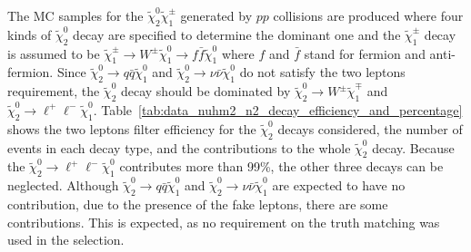 The MC samples for the $\widetilde{\chi}^{0}_{2} \widetilde{\chi}^{\pm}_{1}$ generated by $pp$ collisions are produced where four kinds of $\widetilde{\chi}^{0}_{2}$ decay are specified to determine the dominant one and the $\widetilde{\chi}^{\pm}_{1}$ decay is assumed to be $\widetilde{\chi}^{\pm}_{1} \to W^{\pm} \widetilde{\chi}^{0}_{1} \to f\bar{f} \widetilde{\chi}^{0}_{1}$ where $f$ and $\bar{f}$ stand for fermion and anti-fermion.
Since $\widetilde{\chi}^{0}_{2} \to q\bar{q} \widetilde{\chi}^{0}_{1}$ and $\widetilde{\chi}^{0}_{2} \to \nu\bar{\nu} \widetilde{\chi}^{0}_{1}$ do not satisfy the two leptons requirement, the $\widetilde{\chi}^{0}_{2}$ decay should be dominated by $\widetilde{\chi}^{0}_{2} \to W^{\pm} \widetilde{\chi}^{\mp}_{1}$ and $\widetilde{\chi}^{0}_{2} \to \ell^{+}\ell^{-} \widetilde{\chi}^{0}_{1}$.
Table~\ref{tab:data_nuhm2_n2_decay_efficiency_and_percentage} shows the two leptons filter efficiency for the $\widetilde{\chi}^{0}_{2}$ decays considered, the number of events in each decay type, and the contributions to the whole $\widetilde{\chi}^{0}_{2}$ decay.
Because the $\tilde{\chi}^{0}_{2} \to \ell^{+} \ell^{-} \tilde{\chi}^{0}_{1}$ contributes more than 99\%, the other three decays can be neglected.
Although $\tilde{\chi}^{0}_{2} \to q \bar{q} \tilde{\chi}^{0}_{1}$ and $\tilde{\chi}^{0}_{2} \to \nu \bar{\nu} \tilde{\chi}^{0}_{1}$ are expected to have no contribution, due to the presence of the fake leptons, there are some contributions.
This is expected, as no requirement on the truth matching was used in the selection.

